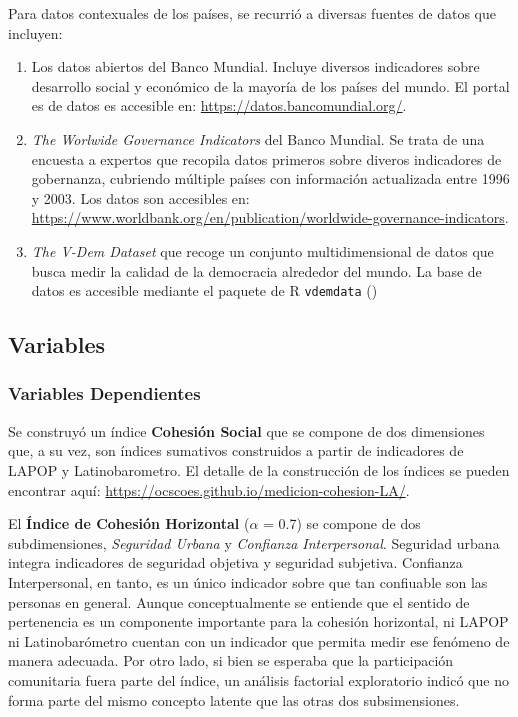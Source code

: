 \documentclass[
  letterpaper,
  DIV=11,
  numbers=noendperiod]{scrartcl}
\begin{document}
Para datos contexuales de los países, se recurrió a diversas fuentes de
datos que incluyen:

\begin{enumerate}
\def\labelenumi{\arabic{enumi})}
\item
  Los datos abiertos del Banco Mundial. Incluye diversos indicadores
  sobre desarrollo social y económico de la mayoría de los países del
  mundo. El portal es de datos es accesible en:
  \url{https://datos.bancomundial.org/}.
\item
  \emph{The Worlwide Governance Indicators} del Banco Mundial. Se trata
  de una encuesta a expertos que recopila datos primeros sobre diveros
  indicadores de gobernanza, cubriendo múltiple países con información
  actualizada entre 1996 y 2003. Los datos son accesibles en:
  \url{https://www.worldbank.org/en/publication/worldwide-governance-indicators}.
\item
  \emph{The V-Dem Dataset} que recoge un conjunto multidimensional de
  datos que busca medir la calidad de la democracia alrededor del mundo.
  La base de datos es accesible mediante el paquete de R
  \texttt{vdemdata} ()
\end{enumerate}

\subsection{Variables}\label{variables}

\subsubsection{Variables Dependientes}\label{variables-dependientes}

Se construyó un índice \textbf{Cohesión Social} que se compone de dos
dimensiones que, a su vez, son índices sumativos construidos a partir de
indicadores de LAPOP y Latinobarometro. El detalle de la construcción de
los índices se pueden encontrar aquí:
\url{https://ocscoes.github.io/medicion-cohesion-LA/}.

El \textbf{Índice de Cohesión Horizontal} (\(\alpha\) = 0.7) se compone
de dos subdimensiones, \emph{Seguridad Urbana} y \emph{Confianza
Interpersonal}. Seguridad urbana integra indicadores de seguridad
objetiva y seguridad subjetiva. Confianza Interpersonal, en tanto, es un
único indicador sobre que tan confiuable son las personas en general.
Aunque conceptualmente se entiende que el sentido de pertenencia es un
componente importante para la cohesión horizontal, ni LAPOP ni
Latinobarómetro cuentan con un indicador que permita medir ese fenómeno
de manera adecuada. Por otro lado, si bien se esperaba que la
participación comunitaria fuera parte del índice, un análisis factorial
exploratorio indicó que no forma parte del mismo concepto latente que
las otras dos subsimensiones.
\end{document}
